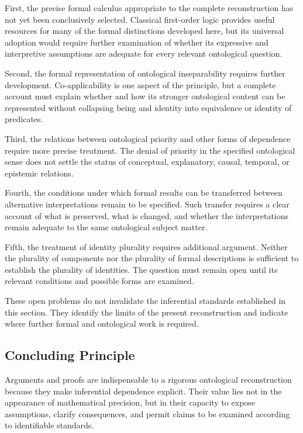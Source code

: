 First, the precise formal calculus appropriate to the complete
reconstruction has not yet been conclusively selected. Classical
first-order logic provides useful resources for many of the
formal distinctions developed here, but its universal adoption
would require further examination of whether its expressive
and interpretive assumptions are adequate for every relevant
ontological question.

Second, the formal representation of ontological inseparability
requires further development. Co-applicability is one aspect
of the principle, but a complete account must explain whether
and how its stronger ontological content can be represented
without collapsing being and identity into equivalence or
identity of predicates.

Third, the relations between ontological priority and other
forms of dependence require more precise treatment. The denial
of priority in the specified ontological sense does not settle
the status of conceptual, explanatory, causal, temporal, or
epistemic relations.

Fourth, the conditions under which formal results can be
transferred between alternative interpretations remain to be
specified. Such transfer requires a clear account of what is
preserved, what is changed, and whether the interpretations
remain adequate to the same ontological subject matter.

Fifth, the treatment of identity plurality requires additional
argument. Neither the plurality of components nor the plurality
of formal descriptions is sufficient to establish the plurality
of identities. The question must remain open until its relevant
conditions and possible forms are examined.

These open problems do not invalidate the inferential standards
established in this section. They identify the limits of the
present reconstruction and indicate where further formal and
ontological work is required.

\subsection{Concluding Principle}

Arguments and proofs are indispensable to a rigorous ontological
reconstruction because they make inferential dependence explicit.
Their value lies not in the appearance of mathematical precision,
but in their capacity to expose assumptions, clarify consequences,
and permit claims to be examined according to identifiable
standards.

